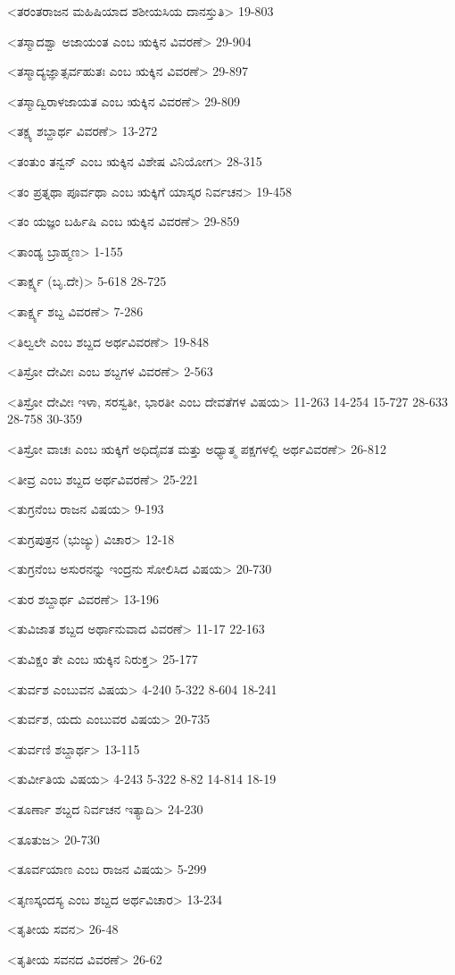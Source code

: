 <ತರಂತರಾಜನ ಮಹಿಷಿಯಾದ ಶಶೀಯಸಿಯ ದಾನಸ್ತುತಿ>
19-803

<ತಸ್ಮಾದಶ್ವಾ ಅಜಾಯಂತ ಎಂಬ ಋಕ್ಕಿನ ವಿವರಣೆ>
29-904

<ತಸ್ಮಾದ್ಯಜ್ಞಾತ್ಸರ್ವಹುತಃ ಎಂಬ ಋಕ್ಕಿನ ವಿವರಣೆ>
29-897

<ತಸ್ಮಾದ್ವಿರಾಳಜಾಯತ ಎಂಬ ಋಕ್ಕಿನ ವಿವರಣೆ>
29-809

<ತಕ್ಷ್ಯ ಶಬ್ದಾರ್ಥ ವಿವರಣೆ>
13-272

<ತಂತುಂ ತನ್ವನ್‍ ಎಂಬ ಋಕ್ಕಿನ ವಿಶೇಷ ವಿನಿಯೋಗ>
28-315

<ತಂ ಪ್ರತ್ನಥಾ ಪೂರ್ವಥಾ ಎಂಬ ಋಕ್ಕಿಗೆ ಯಾಸ್ಕರ ನಿರ್ವಚನ>
19-458

<ತಂ ಯಜ್ಞಂ ಬರ್ಹಿಷಿ ಎಂಬ ಋಕ್ಕಿನ ವಿವರಣೆ>
29-859

<ತಾಂಡ್ಯ ಬ್ರಾಹ್ಮಣ>
1-155

<ತಾರ್ಕ್ಷ್ಯ (ಬೃ.ದೇ)>
5-618
28-725

<ತಾರ್ಕ್ಷ್ಯ ಶಬ್ದ ವಿವರಣೆ>
7-286

<ತಿಲ್ವಲೇ ಎಂಬ ಶಬ್ದದ ಅರ್ಥವಿವರಣೆ>
19-848

<ತಿಸ್ರೋ ದೇವೀಃ ಎಂಬ ಶಬ್ದಗಳ ವಿವರಣೆ>
2-563

<ತಿಸ್ರೋ ದೇವೀಃ ಇಳಾ, ಸರಸ್ವತೀ, ಭಾರತೀ ಎಂಬ ದೇವತೆಗಳ ವಿಷಯ>
11-263 
14-254
15-727 
28-633
28-758
30-359

<ತಿಸ್ರೋ ವಾಚಃ ಎಂಬ ಋಕ್ಕಿಗೆ ಅಧಿದೈವತ ಮತ್ತು ಅಧ್ಯಾತ್ಮ ಪಕ್ಷಗಳಲ್ಲಿ ಅರ್ಥವಿವರಣೆ>
26-812

<ತೀವ್ರ ಎಂಬ ಶಬ್ದದ ಅರ್ಥವಿವರಣೆ>
25-221

<ತುಗ್ರನೆಂಬ ರಾಜನ ವಿಷಯ>
9-193

<ತುಗ್ರಪುತ್ರನ (ಭುಜ್ಯು) ವಿಚಾರ>
12-18

<ತುಗ್ರನೆಂಬ ಅಸುರನನ್ನು ಇಂದ್ರನು ಸೋಲಿಸಿದ ವಿಷಯ>
20-730

<ತುರ ಶಬ್ದಾರ್ಥ ವಿವರಣೆ>
13-196

<ತುವಿಜಾತ ಶಬ್ದದ ಅರ್ಥಾನುವಾದ ವಿವರಣೆ>
11-17 
22-163

<ತುವಿಕ್ಷಂ ತೇ ಎಂಬ ಋಕ್ಕಿನ ನಿರುಕ್ತ>
25-177

<ತುರ್ವಶ ಎಂಬುವನ ವಿಷಯ>
4-240 
5-322 
8-604
18-241

<ತುರ್ವಶ, ಯದು ಎಂಬುವರ ವಿಷಯ>
20-735

<ತುರ್ವಣಿ ಶಬ್ದಾರ್ಥ>
13-115

<ತುರ್ವೀತಿಯ ವಿಷಯ>
4-243 
5-322 
8-82 
14-814
18-19

<ತೂರ್ಣಾ ಶಬ್ದದ ನಿರ್ವಚನ ಇತ್ಯಾದಿ>
24-230

<ತೂತುಜ>
20-730

<ತೂರ್ವಯಾಣ ಎಂಬ ರಾಜನ ವಿಷಯ>
5-299

<ತೃಣಸ್ಕಂದಸ್ಯ ಎಂಬ ಶಬ್ದದ ಅರ್ಥವಿಚಾರ>
13-234

<ತೃತೀಯ ಸವನ>
26-48

<ತೃತೀಯ ಸವನದ ವಿವರಣೆ>
26-62

